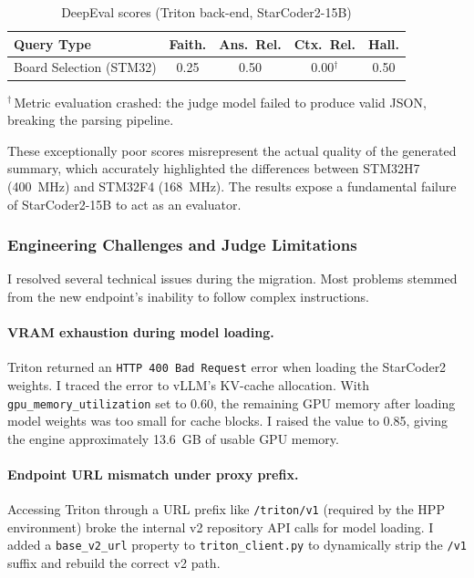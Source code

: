 \begin{table}[ht]
    \centering
    \caption{DeepEval scores (Triton back-end, StarCoder2-15B)}
    \label{tab:deepeval-triton}
    \begin{tabular}{|l|c|c|c|c|}
        \hline
        \textbf{Query Type}     & \textbf{Faith.} & \textbf{Ans.\ Rel.} & \textbf{Ctx.\ Rel.} & \textbf{Hall.} \\
        \hline
        Board Selection (STM32) & 0.25            & 0.50                & 0.00$^{\dagger}$    & 0.50           \\
        \hline
    \end{tabular}
    \vspace{3pt}

    {\small $^{\dagger}$\,Metric evaluation crashed: the judge model failed to produce valid JSON, breaking the parsing pipeline.}
\end{table}

These exceptionally poor scores misrepresent the actual quality of the generated summary, which accurately highlighted the differences between STM32H7 (400~MHz) and STM32F4 (168~MHz). The results expose a fundamental failure of StarCoder2-15B to act as an evaluator.

\subsubsection{Engineering Challenges and Judge Limitations}
I resolved several technical issues during the migration. Most problems stemmed from the new endpoint's inability to follow complex instructions.

\paragraph{VRAM exhaustion during model loading.} Triton returned an \texttt{HTTP 400 Bad Request} error when loading the StarCoder2 weights. I traced the error to vLLM's KV-cache allocation. With \texttt{gpu\_memory\_utilization} set to 0.60, the remaining GPU memory after loading model weights was too small for cache blocks. I raised the value to 0.85, giving the engine approximately 13.6~GB of usable GPU memory.

\paragraph{Endpoint URL mismatch under proxy prefix.} Accessing Triton through a URL prefix like \texttt{/triton/v1} (required by the HPP environment) broke the internal v2 repository API calls for model loading. I added a \texttt{base\_v2\_url} property to \texttt{triton\_client.py} to dynamically strip the \texttt{/v1} suffix and rebuild the correct v2 path.

